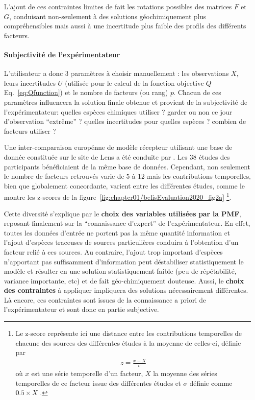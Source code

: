 L'ajout de ces contraintes limites de fait les rotations possibles des matrices $F$ et
$G$, conduisant non-seulement à des solutions géochimiquement plus compréhensibles mais
aussi à une incertitude plus faible des profils des différents facteurs.

\paragraph{Subjectivité de l'expérimentateur}%
\label{par:subjectivité_de_l_expérimentateur}

L'utilisateur a donc 3 paramètres à choisir manuellement : les observations $X$, leurs
incertitudes $U$ (utilisée pour le calcul de la fonction objective $Q$
Eq.~\ref{eq:Qfunction}) et le nombre de facteurs (ou rang) $p$. Chacun de ces paramètres
influencera la solution finale obtenue et provient de la subjectivité de l'expérimentateur:
quelles espèces chimiques utiliser ? garder ou non ce jour d'observation ``extrême'' ?
quelles incertitudes pour quelles espèces ? combien de facteurs utiliser ?

Une inter-comparaison europénne de modèle récepteur utilisant une base de donnée
constituée sur le site de Lens a été conduite par
\cite{belisEvaluation2020}. Les 38 études des participants bénéficiaient de
la même base de données. Cependant, non seulement le nombre de facteurs retrouvés varie de 5 à 12 mais 
les contributions temporelles, bien que globalement concordante, varient entre les
différentes études, comme le montre les z-scores de la figure~\ref{fig:chapter01/belisEvaluation2020_fig2a}
\footnote{Le z-score représente ici une distance entre les contributions temporelles de
    chacune des sources des différentes études à la moyenne de celles-ci, définie par 
    \begin{align}
        \label{eq:z-score}
        z = \frac{x-X}{\sigma}
    \end{align}
    où $x$ est une série temporelle d'un facteur, $X$ la moyenne des séries temporelles de
    ce facteur issue des différentes études et $\sigma$ définie comme $0.5\times X$
    \parencite{pernigottiDeltaSA2018}.
}.

Cette diversité s'explique par le \textbf{choix des variables utilisées par la PMF},
reposant finalement sur la ``connaissance d'expert'' de l'expérimentateur. En effet, toutes les données
d'entrée ne portent pas la même quantité information et l'ajout d'espèces traceuses de
sources particulières conduira à l'obtention d'un facteur relié à ces sources. Au
contraire, l'ajout trop important d'espèces n'apportant pas suffisamment d'information peut
déstabiliser statistiquement le modèle et résulter en une solution statistiquement faible
(peu de répétabilité, variance importante, etc) et de fait géo-chimiquement douteuse.
Aussi, le \textbf{choix des contraintes} à appliquer impliquera des solutions
nécessairement différentes. Là encore, ces contraintes sont issues de la connaissance a
priori de l'expérimentateur et sont donc en partie subjective.


